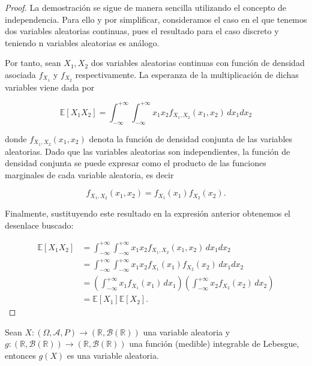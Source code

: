 \begin{proof}
    La demostración se sigue de manera sencilla utilizando el concepto de independencia. Para ello y por simplificar, consideramos el caso en el que tenemos dos variables aleatorias continuas, pues el resultado para el caso discreto y teniendo n variables aleatorias es análogo.

    Por tanto, sean $X_1, X_2$ dos variables aleatorias continuas con función de densidad asociada $f_{X_1}$ y $f_{X_2}$ respectivamente. La esperanza de la multiplicación de dichas variables viene dada por

    \[ \mathbb{E}[X_1X_2] = \int_{-\infty}^{+\infty}\int_{-\infty}^{+\infty} x_1x_2 f_{X_1, X_2} (x_1, x_2) \, dx_1dx_2 \]

    donde $f_{X_1, X_2} (x_1, x_2)$ denota la función de densidad conjunta de las variables aleatorias. Dado que las variables aleatorias son independientes, la función de densidad conjunta se puede expresar como el producto de las funciones marginales de cada variable aleatoria, es decir

    \[ f_{X_1, X_2} (x_1, x_2) = f_{X_1}(x_1) f_{X_2}(x_2). \]

    Finalmente, sustituyendo este resultado en la expresión anterior obtenemos el desenlace buscado:

    \begin{align*}
        \mathbb{E}[X_1 X_2] &= \int_{-\infty}^{+\infty} \int_{-\infty}^{+\infty} x_1 x_2 f_{X_1, X_2}(x_1, x_2) \, dx_1 dx_2 \\
        &= \int_{-\infty}^{+\infty} \int_{-\infty}^{+\infty} x_1 x_2 f_{X_1}(x_1) f_{X_2}(x_2) \, dx_1 dx_2 \\
        &= \left(\int_{-\infty}^{+\infty} x_1 f_{X_1}(x_1) \, dx_1\right)
           \left(\int_{-\infty}^{+\infty} x_2 f_{X_2}(x_2) \, dx_2\right) \\
        &= \mathbb{E}[X_1] \mathbb{E}[X_2].
    \end{align*}
    
\end{proof}

\begin{proposicion}
    Sean $X: (\Omega, \mathcal{A}, P) \to (\mathbb{R}, \mathcal{B}(\mathbb{R}))$ una variable aleatoria y $g:(\mathbb{R},\mathcal{B}(\mathbb{R})) \to (\mathbb{R},\mathcal{B}(\mathbb{R}))$ una función (medible) integrable de Lebesgue, entonces $g(X)$ es una variable aleatoria.
\end{proposicion}

